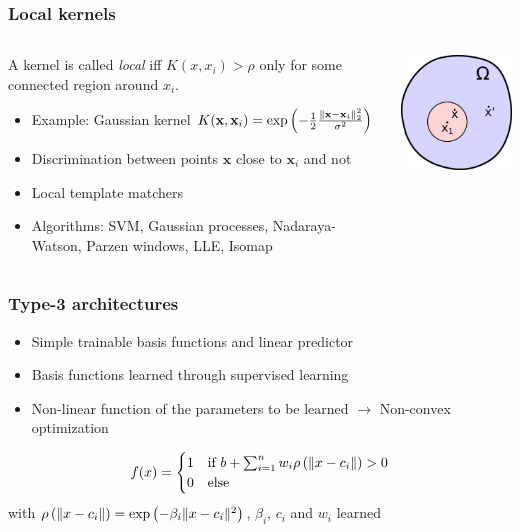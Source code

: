 \begin{frame}
	\frametitle{Local kernels}
	\begin{columns}
		\begin{column}{7cm}
			\begin{definition}
				A kernel is called \emph{local} iff $K(x,x_{i})>\rho$ only for some connected region around $x_i$.
			\end{definition}
			\begin{itemize}
				\item Example: Gaussian kernel $K(\mathbf{x},\mathbf{x}_i) =\exp{\left(-\frac{1}{2}\frac{\lVert\mathbf{x}-\mathbf{x}_i\rVert^2_2}{\sigma^2}\right)}$
				\item Discrimination between points $\mathbf{x}$ close to $\mathbf{x}_i$ and not
				\item Local template matchers
				\item Algorithms: SVM, Gaussian processes, Nadaraya-Watson, Parzen windows, LLE, Isomap
			\end{itemize}
		\end{column}
		\begin{column}{4.5cm}
			\includegraphics[width=4.5cm]{images/localKernel.png}
		\end{column}
	\end{columns}
\end{frame}

\begin{frame}
	\frametitle{Type-3 architectures}
	\begin{itemize}
		\item Simple trainable basis functions and linear predictor
		\item Basis functions learned through supervised learning
		\item Non-linear function of the parameters to be learned $\rightarrow$ Non-convex optimization
	\end{itemize}
	\begin{example}
		\begin{displaymath}
			f(x)= \begin{cases}
				1& \text{if } b + \sum_{i=1}^{n}w_i \rho\left(\lVert x-c_{i}\rVert\right) > 0\\
				0& \text{else}
			\end{cases}
		\end{displaymath}
		with $\rho\left(\lVert x-c_i\rVert\right) = \exp{\left(-\beta_i \lVert x-c_i\rVert^2 \right)}$, $\beta_i$, $c_i$ and $w_i$ learned
	\end{example}
\end{frame}

